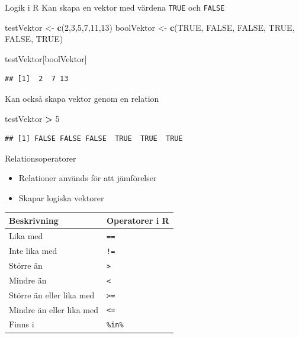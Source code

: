 \documentclass[
  11pt,
  ignorenonframetext,
]{beamer}
\newenvironment{Shaded}{\begin{snugshade}}{\end{snugshade}}
\newcommand{\DecValTok}[1]{\textcolor[rgb]{0.00,0.00,0.81}{#1}}
\newcommand{\KeywordTok}[1]{\textcolor[rgb]{0.13,0.29,0.53}{\textbf{#1}}}
\newcommand{\NormalTok}[1]{#1}
\newcommand{\OperatorTok}[1]{\textcolor[rgb]{0.81,0.36,0.00}{\textbf{#1}}}
\newcommand{\OtherTok}[1]{\textcolor[rgb]{0.56,0.35,0.01}{#1}}
\newcommand{\StringTok}[1]{\textcolor[rgb]{0.31,0.60,0.02}{#1}}
\providecommand{\tightlist}{%
  \setlength{\itemsep}{0pt}\setlength{\parskip}{0pt}}
\begin{document}
\begin{frame}[fragile]{Logik i R}
\protect\hypertarget{logik-i-r}{}
Kan skapa en vektor med värdena \texttt{TRUE} och \texttt{FALSE}

\begin{Shaded}
\begin{Highlighting}[]
\NormalTok{testVektor \textless{}{-}}\StringTok{ }\KeywordTok{c}\NormalTok{(}\DecValTok{2}\NormalTok{,}\DecValTok{3}\NormalTok{,}\DecValTok{5}\NormalTok{,}\DecValTok{7}\NormalTok{,}\DecValTok{11}\NormalTok{,}\DecValTok{13}\NormalTok{)}
\NormalTok{boolVektor \textless{}{-}}\StringTok{ }\KeywordTok{c}\NormalTok{(}\OtherTok{TRUE}\NormalTok{, }\OtherTok{FALSE}\NormalTok{, }\OtherTok{FALSE}\NormalTok{, }\OtherTok{TRUE}\NormalTok{, }\OtherTok{FALSE}\NormalTok{, }\OtherTok{TRUE}\NormalTok{)}
\end{Highlighting}
\end{Shaded}

\begin{Shaded}
\begin{Highlighting}[]
\NormalTok{testVektor[boolVektor]}
\end{Highlighting}
\end{Shaded}

\pause

\begin{verbatim}
## [1]  2  7 13
\end{verbatim}

\pause

Kan också skapa vektor genom en relation

\begin{Shaded}
\begin{Highlighting}[]
\NormalTok{testVektor }\OperatorTok{\textgreater{}}\StringTok{ }\DecValTok{5}
\end{Highlighting}
\end{Shaded}

\begin{verbatim}
## [1] FALSE FALSE FALSE  TRUE  TRUE  TRUE
\end{verbatim}
\end{frame}

\begin{frame}{Relationsoperatorer}
\protect\hypertarget{relationsoperatorer}{}
\begin{itemize}
\tightlist
\item
  Relationer används för att jämförelser
\item
  Skapar logiska vektorer
\end{itemize}

\begin{longtable}[]{@{}ll@{}}
\toprule
Beskrivning & Operatorer i R\tabularnewline
\midrule
\endhead
Lika med & \texttt{==}\tabularnewline
Inte lika med & \texttt{!=}\tabularnewline
Större än & \texttt{>}\tabularnewline
Mindre än & \texttt{<}\tabularnewline
Större än eller lika med & \texttt{>=}\tabularnewline
Mindre än eller lika med & \texttt{<=}\tabularnewline
Finns i & \texttt{\%in\%}\tabularnewline
\bottomrule
\end{longtable}
\end{frame}
\end{document}
